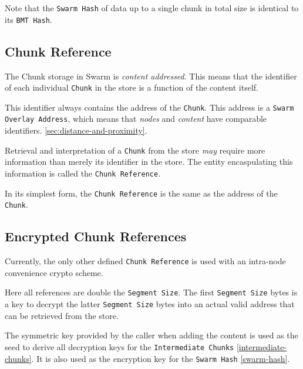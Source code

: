 Note that the \texttt{Swarm Hash} of data up to a single chunk in total size is identical to its \texttt{BMT Hash}.

\subsection{Chunk Reference}

The Chunk storage in Swarm is \emph{content addressed}. This means that the identifier of each individual \texttt{Chunk} in the store is a function of the content itself.

This identifier always contains the address of the \texttt{Chunk}. This address is a \texttt{Swarm Overlay Address}, which means that \emph{nodes} and \emph{content} have comparable identifiers. \ref{sec:distance-and-proximity}.

Retrieval and interpretation of a \texttt{Chunk} from the store \emph{may} require more information than merely its identifier in the store. The entity encaspulating this information is called the \texttt{Chunk Reference}.

In its simplest form, the \texttt{Chunk Reference} is the same as the address of the \texttt{Chunk}. 

\subsection{Encrypted Chunk References}

Currently, the only other defined \texttt{Chunk Reference} is used with an intra-node convenience crypto scheme.

Here all references are double the \texttt{Segment Size}. The first \texttt{Segment Size} bytes is a key to decrypt the latter \texttt{Segment Size} bytes into an actual valid address that can be retrieved from the store.

The symmetric key provided by the caller when adding the content is used as the seed to derive all decryption keys for the \texttt{Intermediate Chunks} \ref{intermediate-chunks}. It is also used as the encryption key for the \texttt{Swarm Hash} \ref{swarm-hash}.

